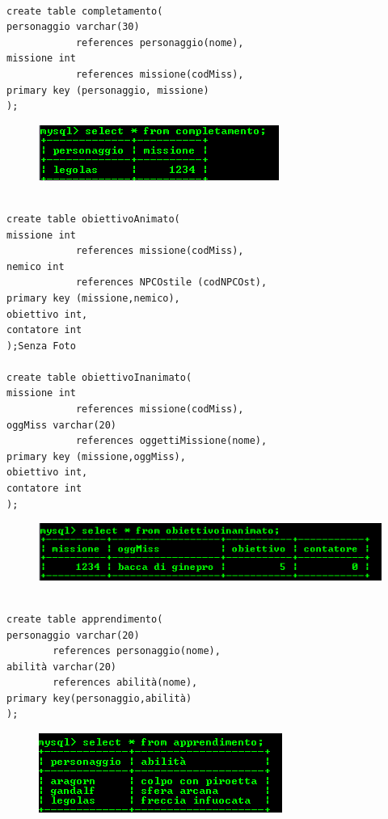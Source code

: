 \begin{verbatim}

create table completamento(  
personaggio varchar(30)
			references personaggio(nome), 
missione int  
			references missione(codMiss), 
primary key (personaggio, missione)
);
\end{verbatim}

\begin{figure}[H]
\centering
\includegraphics[width=0.7\linewidth]{immagini/20}
\caption{}
\label{fig:1}
\end{figure}

\begin{verbatim}

create table obiettivoAnimato( 
missione int 
			references missione(codMiss), 
nemico int 
			references NPCOstile (codNPCOst), 
primary key (missione,nemico), 
obiettivo int, 
contatore int
);Senza Foto

create table obiettivoInanimato( 
missione int 
			references missione(codMiss), 
oggMiss varchar(20) 
			references oggettiMissione(nome), 
primary key (missione,oggMiss), 
obiettivo int, 
contatore int
);
\end{verbatim}

\begin{figure}[H]
\centering
\includegraphics[width=0.7\linewidth]{immagini/21}
\caption{}
\label{fig:1}
\end{figure}

\begin{verbatim}

create table apprendimento(
personaggio varchar(20) 
		references personaggio(nome), 
abilità varchar(20) 
		references abilità(nome), 
primary key(personaggio,abilità)
);

\end{verbatim}

\begin{figure}[H]
\centering
\includegraphics[width=0.7\linewidth]{immagini/22}
\caption{}
\label{fig:1}
\end{figure}

